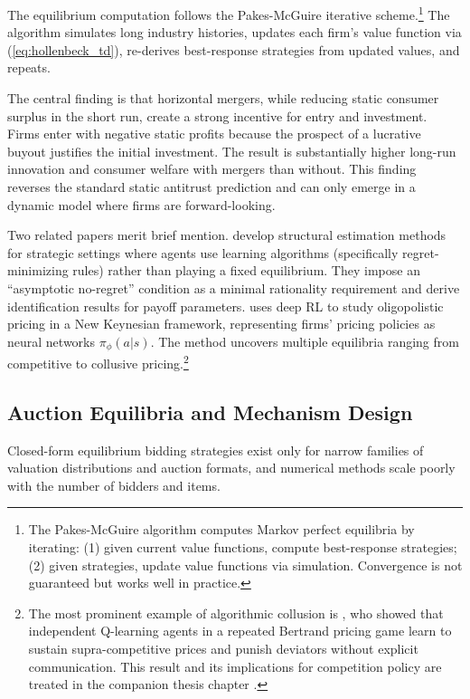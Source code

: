 The equilibrium computation follows the Pakes-McGuire iterative scheme.\footnote{The Pakes-McGuire algorithm \citep{PakesMcGuire1994} computes Markov perfect equilibria by iterating: (1) given current value functions, compute best-response strategies; (2) given strategies, update value functions via simulation. Convergence is not guaranteed but works well in practice.} The algorithm simulates long industry histories, updates each firm's value function via (\ref{eq:hollenbeck_td}), re-derives best-response strategies from updated values, and repeats.

The central finding is that horizontal mergers, while reducing static consumer surplus in the short run, create a strong incentive for entry and investment. Firms enter with negative static profits because the prospect of a lucrative buyout justifies the initial investment. The result is substantially higher long-run innovation and consumer welfare with mergers than without. This finding reverses the standard static antitrust prediction and can only emerge in a dynamic model where firms are forward-looking.

Two related papers merit brief mention. \citet{LomysMagnolfi2024} develop structural estimation methods for strategic settings where agents use learning algorithms (specifically regret-minimizing rules) rather than playing a fixed equilibrium. They impose an ``asymptotic no-regret'' condition as a minimal rationality requirement and derive identification results for payoff parameters. \citet{Covarrubias2022} uses deep RL to study oligopolistic pricing in a New Keynesian framework, representing firms' pricing policies as neural networks $\pi_\phi(a|s)$. The method uncovers multiple equilibria ranging from competitive to collusive pricing.\footnote{The most prominent example of algorithmic collusion is \citet{Calvano2020}, who showed that independent Q-learning agents in a repeated Bertrand pricing game learn to sustain supra-competitive prices and punish deviators without explicit communication. This result and its implications for competition policy are treated in the companion thesis chapter \citep{Rawat2026collusion}.}


\subsection{Auction Equilibria and Mechanism Design}

Closed-form equilibrium bidding strategies exist only for narrow families of valuation distributions and auction formats, and numerical methods scale poorly with the number of bidders and items.


